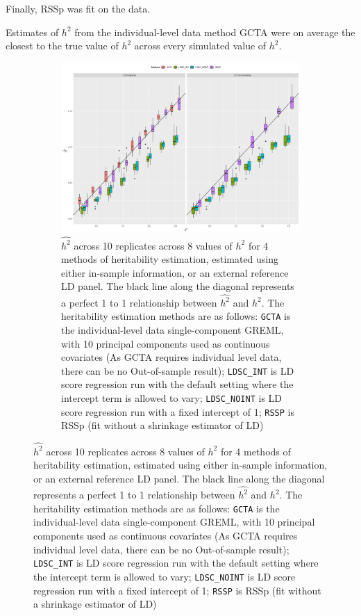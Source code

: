 Finally, RSSp was fit on the data.  


Estimates of $h^2$ from the individual-level data method GCTA were on average the closest to the true value of $h^2$ across every simulated value of $h^2$. 



  \begin{figure}
      \centering
  \begin{subfigure}[t]{\textwidth}
    \centering
    \includegraphics[width=.9\linewidth]{img/rsspnld_v_ldsc_v_gcta.png}
    \caption{$\hat{h^2}$ across 10 replicates across 8 values of $h^2$ for 4 methods of heritability estimation, estimated using either in-sample information, or an external reference LD panel. The black line along the diagonal represents a perfect 1 to 1 relationship between $\hat{h^2}$ and $h^2$.    The heritability estimation methods are as follows: 
    \texttt{GCTA} is the individual-level data single-component GREML, with 10 principal components used as continuous covariates (As GCTA requires individual level data, there can be no Out-of-sample result);
    \texttt{LDSC\_INT} is LD score regression \cite{ldsc} run with the default setting where the intercept term is allowed to vary; 
    \texttt{LDSC\_NOINT} is LD score regression run with a fixed intercept of 1;
    \texttt{RSSP} is RSSp (fit without a shrinkage estimator of LD)}\label{fig:rssp_method_comparison}
  \end{subfigure}
\end{figure}



